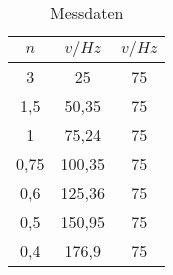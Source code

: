 

%




\begin{table}
  \centering
  \caption{Messdaten}
  \label{tab:Frequenz}
  \begin{tabular}{c c c}
    \toprule
    $n$ & $v/Hz$ & $v/Hz$\\

    \midrule
    3     &25     & 75\\
    1,5   &50,35  & 75\\
    1     &75,24  & 75\\
    0,75  &100,35 & 75\\
    0,6   &125,36 & 75\\
    0,5   &150,95 & 75\\
    0,4   &176,9  & 75\\
    \bottomrule
  \end{tabular}
\end{table}

%
